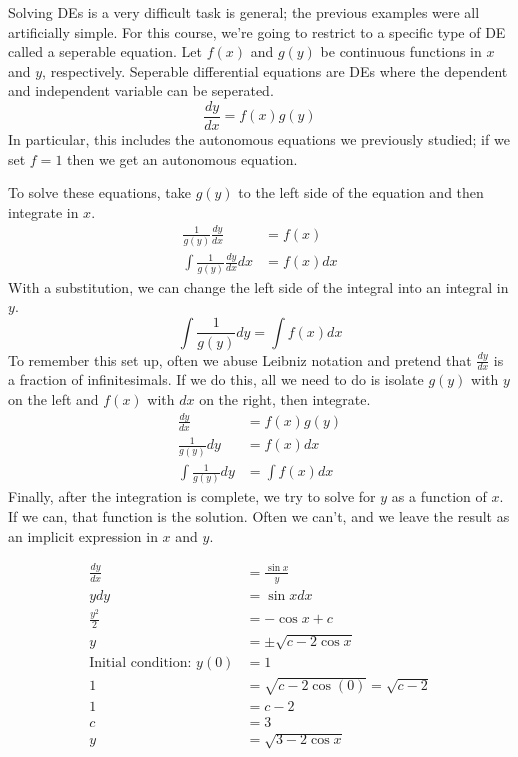 \documentclass[fleqn]{report}
\begin{document}
Solving DEs is a very difficult task is general; the previous
examples were all artificially simple. For this course, we're
going to restrict to a specific type of DE called a seperable
equation. Let $f(x)$ and $g(y)$ be continuous functions in
$x$ and $y$, respectively. Seperable differential equations
are DEs where the dependent and independent variable can be
seperated.
\begin{equation*}
\frac{dy}{dx} = f(x) g(y)
\end{equation*}
In particular, this includes the autonomous equations we
previously studied; if we set $f=1$ then we get an autonomous
equation.

To solve these equations, take $g(y)$ to the left side of the
equation and then integrate in $x$.
\begin{align*}
\frac{1}{g(y)} \frac{dy}{dx} & = f(x) \\
\int \frac{1}{g(y)} \frac{dy}{dx} dx & = f(x) dx 
\end{align*}
With a substitution, we can change the left side of the
integral into an integral in $y$.
\begin{equation*}
\int \frac{1}{g(y)} dy = \int f(x) dx
\end{equation*}
To remember this set up, often we abuse
Leibniz notation and pretend that $\frac{dy}{dx}$ is a
fraction of infinitesimals. If we do this, all we need to do is
isolate $g(y)$ with $y$ on the left and $f(x)$ with $dx$ on
the right, then integrate.
\begin{align*}
\frac{dy}{dx} & = f(x) g(y) \\
\frac{1}{g(y)} dy & = f(x) dx \\
\int \frac{1}{g(y)} dy & = \int f(x) dx
\end{align*}
Finally, after the integration is complete, we try to solve
for $y$ as a function of $x$. If we can, that function is the
solution. Often we can't, and we leave the result as an
implicit expression in $x$ and $y$. 

\begin{example}
\begin{align*}
\frac{dy}{dx} & = \frac{\sin x}{y} \\
y dy & = \sin x dx \\
\frac{y^2}{2} & = - \cos x + c \\
y & = \pm \sqrt{c - 2\cos x} \\
\text{Initial condition: } y(0) & = 1 \\
1 & = \sqrt{c - 2 \cos (0)} = \sqrt{c-2}\\
1 & = c-2 \\
c & = 3 \\
y & = \sqrt{3 - 2 \cos x} 
\end{align*}
\end{example}
\end{document}
